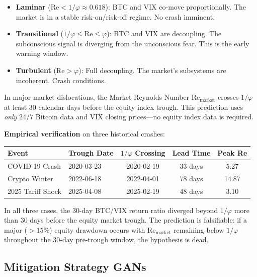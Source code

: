 \begin{itemize}[noitemsep]
  \item \textbf{Laminar} ($\mathrm{Re} < 1/\varphi \approx 0.618$): BTC and VIX co-move proportionally. The market is in a stable risk-on/risk-off regime. No crash imminent.
  \item \textbf{Transitional} ($1/\varphi \leq \mathrm{Re} \leq \varphi$): BTC and VIX are decoupling. The subconscious signal is diverging from the unconscious fear. This is the early warning window.
  \item \textbf{Turbulent} ($\mathrm{Re} > \varphi$): Full decoupling. The market's subsystems are incoherent. Crash conditions.
\end{itemize}

\begin{hypothesis}\label{hyp:reynolds_crash}
In major market dislocations, the Market Reynolds Number $\mathrm{Re}_{\text{market}}$ crosses $1/\varphi$ at least 30 calendar days before the equity index trough. This prediction uses \emph{only} 24/7 Bitcoin data and VIX closing prices---no equity index data is required.
\end{hypothesis}

\textbf{Empirical verification} on three historical crashes:
\begin{center}
\begin{tabular}{@{}llccc@{}}
\toprule
\textbf{Event} & \textbf{Trough Date} & \textbf{$1/\varphi$ Crossing} & \textbf{Lead Time} & \textbf{Peak Re} \\
\midrule
COVID-19 Crash & 2020-03-23 & 2020-02-19 & 33 days & 5.27 \\
Crypto Winter & 2022-06-18 & 2022-04-01 & 78 days & 14.87 \\
2025 Tariff Shock & 2025-04-08 & 2025-02-19 & 48 days & 3.10 \\
\bottomrule
\end{tabular}
\end{center}

In all three cases, the 30-day BTC/VIX return ratio diverged beyond $1/\varphi$ more than 30 days before the equity market trough. The prediction is falsifiable: if a major ($>15\%$) equity drawdown occurs with $\mathrm{Re}_{\text{market}}$ remaining below $1/\varphi$ throughout the 30-day pre-trough window, the hypothesis is dead.

\subsection{Mitigation Strategy GANs}


